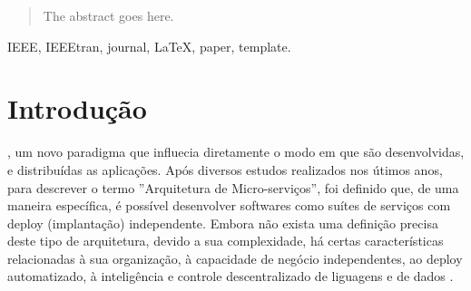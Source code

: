 \documentclass[journal]{IEEEtran}
\begin{document}







\maketitle

\begin{abstract}
The abstract goes here.
\end{abstract}

\begin{IEEEkeywords}
IEEE, IEEEtran, journal, \LaTeX, paper, template.
\end{IEEEkeywords}






%
\IEEEpeerreviewmaketitle



\section{Introdução}
% 
% 
% 
% 
, um novo paradigma que influecia diretamente o modo em que são desenvolvidas, e distribuídas as aplicações. Após diversos estudos realizados nos útimos anos, para descrever o termo ''Arquitetura de Micro-serviços'', foi definido que, de uma maneira específica, é possível desenvolver softwares como suítes de serviços com deploy (implantação) independente. Embora não exista uma definição precisa deste tipo de arquitetura, devido a sua complexidade, há certas características relacionadas à sua organização, à capacidade de negócio independentes, ao deploy automatizado, à inteligência e controle descentralizado de liguagens e de dados \cite{JamesLewis}.
\end{document}
